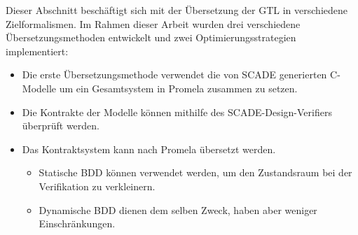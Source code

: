 Dieser Abschnitt beschäftigt sich mit der Übersetzung der GTL in verschiedene Zielformalismen.
Im Rahmen dieser Arbeit wurden drei verschiedene Übersetzungsmethoden entwickelt und zwei Optimierungsstrategien implementiert:
\begin{itemize}
\item Die erste Übersetzungsmethode verwendet die von SCADE generierten C-Modelle um ein Gesamtsystem in Promela zusammen zu setzen.
\item Die Kontrakte der Modelle können mithilfe des SCADE-Design-Verifiers überprüft werden.
\item Das Kontraktsystem kann nach Promela übersetzt werden.
  \begin{itemize}
  \item Statische BDD können verwendet werden, um den Zustandsraum bei der Verifikation zu verkleinern.
  \item Dynamische BDD dienen dem selben Zweck, haben aber weniger Einschränkungen.
  \end{itemize}
\end{itemize}
